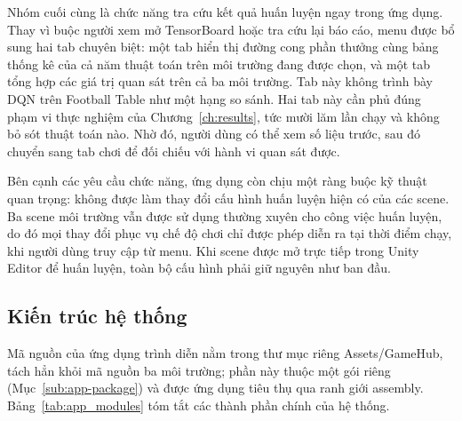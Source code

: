 \indent Nhóm cuối cùng là chức năng tra cứu kết quả huấn luyện ngay trong ứng dụng. Thay
vì buộc người xem mở TensorBoard hoặc tra cứu lại báo cáo, menu được bổ sung hai tab
chuyên biệt: một tab hiển thị đường cong phần thưởng cùng bảng thống kê của cả năm thuật
toán trên môi trường đang được chọn, và một tab tổng hợp các giá trị quan sát trên cả ba
môi trường. Tab này không trình bày DQN trên Football Table như một hạng so sánh. Hai tab
này cần phủ đúng phạm vi thực nghiệm của Chương~\ref{ch:results},
tức mười lăm lần chạy và không bỏ sót thuật toán nào. Nhờ đó, người dùng có thể xem số
liệu trước, sau đó chuyển sang tab chơi để đối chiếu với hành vi quan sát được.

\indent Bên cạnh các yêu cầu chức năng, ứng dụng còn chịu một ràng buộc kỹ thuật quan
trọng: không được làm thay đổi cấu hình huấn luyện hiện có của các scene. Ba scene môi
trường vẫn được sử dụng thường xuyên cho công việc huấn luyện, do đó mọi thay đổi phục vụ
chế độ chơi chỉ được phép diễn ra tại thời điểm chạy, khi người dùng truy cập từ menu. Khi
scene được mở trực tiếp trong Unity Editor để huấn luyện, toàn bộ cấu hình phải giữ nguyên
như ban đầu.

\subsection{Kiến trúc hệ thống}
\label{sub:app-arch}

\indent Mã nguồn của ứng dụng trình diễn nằm trong thư mục riêng
Assets/GameHub, tách hẳn khỏi mã nguồn ba môi trường; phần này thuộc một gói riêng
(Mục~\ref{sub:app-package}) và được ứng dụng tiêu thụ qua ranh giới assembly.
Bảng~\ref{tab:app_modules} tóm tắt các thành phần chính của hệ thống.

